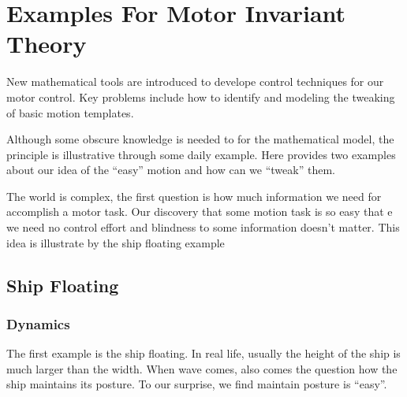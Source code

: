 \section{Examples For Motor Invariant Theory}
%
%
%

New mathematical tools are introduced to develope control techniques for our motor control.
Key problems include how to identify and modeling the tweaking of basic motion templates.





Although some obscure knowledge is needed to for the mathematical model, the principle is illustrative through some daily example. 
Here provides two examples about our idea of the ``easy'' motion and how can we “tweak” them.

The world is complex, the first question is how much information we need for accomplish a motor task. 
Our discovery that some motion task is so easy that e we need no control effort and blindness to some information doesn’t matter.
This idea is illustrate by the ship floating example

\subsection{Ship Floating}


\subsubsection*{Dynamics}
The first example is the ship floating. 
In real life, usually the height of the ship is much larger than the width. 
When wave comes, also comes the question how the ship maintains its posture.
To our surprise, we find maintain posture is “easy”.




